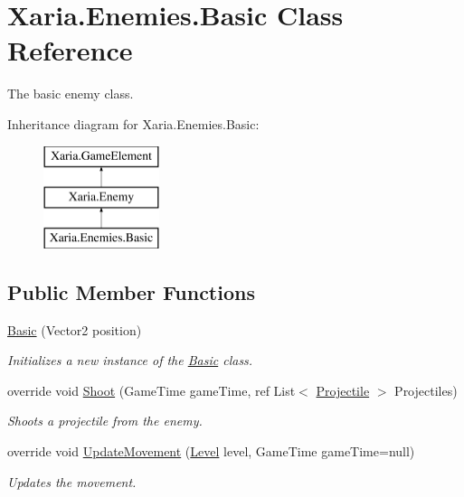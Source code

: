 \hypertarget{classXaria_1_1Enemies_1_1Basic}{}\section{Xaria.\+Enemies.\+Basic Class Reference}
\label{classXaria_1_1Enemies_1_1Basic}


The basic enemy class.  


Inheritance diagram for Xaria.\+Enemies.\+Basic\+:\begin{figure}[H]
\begin{center}
\leavevmode
\includegraphics[height=3.000000cm]{classXaria_1_1Enemies_1_1Basic}
\end{center}
\end{figure}
\subsection*{Public Member Functions}
\begin{DoxyCompactItemize}
\item 
\hyperlink{classXaria_1_1Enemies_1_1Basic_abb1a1d9ed8e8b74741d054b8ee2dde07}{Basic} (Vector2 position)
\begin{DoxyCompactList}\small\item\em Initializes a new instance of the \hyperlink{classXaria_1_1Enemies_1_1Basic}{Basic} class. \end{DoxyCompactList}\item 
override void \hyperlink{classXaria_1_1Enemies_1_1Basic_a60c5523093585a2d52a9b587acf3bc28}{Shoot} (Game\+Time game\+Time, ref List$<$ \hyperlink{classXaria_1_1Projectile}{Projectile} $>$ Projectiles)
\begin{DoxyCompactList}\small\item\em Shoots a projectile from the enemy. \end{DoxyCompactList}\item 
override void \hyperlink{classXaria_1_1Enemies_1_1Basic_a1f8c20016b8ea5c18fca1295510952c9}{Update\+Movement} (\hyperlink{classXaria_1_1Level}{Level} level, Game\+Time game\+Time=null)
\begin{DoxyCompactList}\small\item\em Updates the movement. \end{DoxyCompactList}\end{DoxyCompactItemize}
